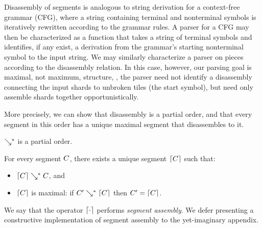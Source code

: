 

Disassembly of segments is analogous to string derivation for a
context-free grammar (CFG),
where a string containing terminal and nonterminal symbols is iteratively
rewritten according to the grammar rules.
A parser for a CFG may then be characterized as a function
that takes a string of terminal symbols and identifies,
if any exist,
a derivation from the grammar's starting nonterminal
symbol to the input string.
We may similarly characterize a parser on pieces according
to the disassembly relation.
In this case, however, our parsing goal is maximal,
not maximum, structure, \ie, the parser
need not identify a disassembly connecting the input
shards to unbroken tiles (the start symbol), but need only assemble shards
together opportunistically.

More precisely, we can show that disassembly is a
partial order, and that every segment in this order
has a unique maximal segment that disassembles to it.
\begin{lemma}
  $\searrow^*$ is a partial order.
\end{lemma}
\begin{lemma}\label{lemma:unique-parsed-selection}
  For every segment $C$, there exists a unique
  segment $\left\lceil C\right\rceil$ such that:
  \begin{itemize}
  \item $\left\lceil C\right\rceil\searrow^*C$, and
  \item $\left\lceil C\right\rceil$ is maximal: if $C'\searrow^*\left\lceil C\right\rceil$ then $C' = \left\lceil C\right\rceil$.
  \end{itemize}
\end{lemma}
\noindent
We say that the operator $\left\lceil\cdot\right\rceil$ performs \emph{segment assembly}.
We defer presenting a constructive implementation of segment
assembly to the yet-imaginary appendix.


